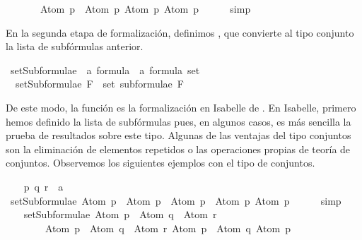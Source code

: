 \begin{isabellebody}
\ \ \ \ \ \ \ {\isacharbrackleft}Atom\ p\ \isactrlbold {\isasymor}\ Atom\ p{\isacharcomma}\ Atom\ p{\isacharcomma}\ Atom\ p{\isacharbrackright}{\isachardoublequoteclose}\isanewline
\ \ \ \ \isamarkupfalse%
\ simp%
\endisatagproof
{\isafoldproof}%
%
\isadelimproof
\isanewline
%
\endisadelimproof
{}\isamarkupfalse%
%
\begin{isamarkuptext}%
En la segunda etapa de formalización, definimos 
  , que convierte al tipo conjunto la lista de 
  subfórmulas anterior.%
\end{isamarkuptext}\isamarkuptrue%
\isamarkupfalse%
\ setSubformulae\ {\isacharcolon}{\isacharcolon}\ {\isachardoublequoteopen}{\isacharprime}a\ formula\ {\isasymRightarrow}\ {\isacharprime}a\ formula\ set{\isachardoublequoteclose}\ \isanewline
\ \ {\isachardoublequoteopen}setSubformulae\ F\ {\isasymequiv}\ set\ {\isacharparenleft}subformulae\ F{\isacharparenright}{\isachardoublequoteclose}%
\begin{isamarkuptext}%
De este modo, la función  es la formalización
  en Isabelle de . En Isabelle, primero hemos definido la lista 
  de subfórmulas pues, en algunos casos, es más sencilla la prueba de 
  resultados sobre este tipo. 
  Algunas de las ventajas del tipo conjuntos son la eliminación de 
  elementos repetidos o las operaciones propias de teoría de conjuntos. 
  Observemos los siguientes ejemplos con el tipo de conjuntos.%
\end{isamarkuptext}\isamarkuptrue%
\isamarkupfalse%
\isanewline
{}\isanewline
%
\isadelimproof
\ \ %
\endisadelimproof
%
\isatagproof
{}\isamarkupfalse%
\ p\ q\ r\ {\isacharcolon}{\isacharcolon}\ {\isacharprime}a\isanewline
\isanewline
\ \ \isamarkupfalse%
\ {\isachardoublequoteopen}setSubformulae\ {\isacharparenleft}Atom\ p\ \isactrlbold {\isasymor}\ Atom\ p{\isacharparenright}\ {\isacharequal}\ {\isacharbraceleft}Atom\ p\ \isactrlbold {\isasymor}\ Atom\ p{\isacharcomma}\ Atom\ p{\isacharbraceright}{\isachardoublequoteclose}\isanewline
\ \ \ \ \isamarkupfalse%
\ simp\isanewline
\ \ \isanewline
\ \ \isamarkupfalse%
\ {\isachardoublequoteopen}setSubformulae\ {\isacharparenleft}{\isacharparenleft}Atom\ p\ \isactrlbold {\isasymrightarrow}\ Atom\ q{\isacharparenright}\ \isactrlbold {\isasymor}\ Atom\ r{\isacharparenright}\ {\isacharequal}\isanewline
\ \ \ \ \ \ \ \ {\isacharbraceleft}{\isacharparenleft}Atom\ p\ \isactrlbold {\isasymrightarrow}\ Atom\ q{\isacharparenright}\ \isactrlbold {\isasymor}\ Atom\ r{\isacharcomma}\ Atom\ p\ \isactrlbold {\isasymrightarrow}\ Atom\ q{\isacharcomma}\ Atom\ p{\isacharcomma}\ \isanewline

\end{isabellebody}
